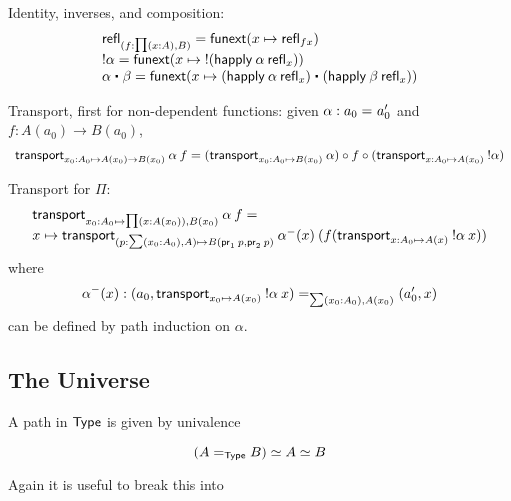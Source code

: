 
Identity, inverses, and composition:
\[
\begin{array}{l}
\refl{(f : \prd{x:A} B)} = \funext(x \mapsto \refl{f x}) \\
\opp{\alpha} = \funext (x \mapsto \opp{(\happly \: {\alpha} \: {\refl x})})  \\
{\alpha} \ct \beta = \funext (x \mapsto {(\happly \: {\alpha} \: {\refl x}) \ct (\happly \: {\beta} \: {\refl x})})  \\
\end{array}
\]

\newcommand{\fcomp}{\circ}

Transport, first for non-dependent functions: given $\alpha : \id {a_0} {a_0'}$
and $f : A(a_0) \to B(a_0)$, 
\[
\begin{array}{l}
\transport{x_0:A_0 \mapsto A(x_0) \to B(x_0)}{\alpha} \: f = 
   (\transport{x_0:A_0 \mapsto B(x_0)}{\alpha}) \fcomp f \fcomp (\transport{x:A_0 \mapsto A(x_0)}{\opp \alpha})
\end{array}
\]

Transport for $\Pi$:  
\[
\begin{array}{l}
\transport{x_0:A_0 \mapsto \prd{x : A(x_0)} B(x_0)}{\alpha} \: f =  \\
   x \mapsto 
   \transport{(p : \sm {x_0:A_0} A) \mapsto B(\proj{1} \: p, \proj{2} \: p)}{\alpha^{\mathord{-}}(x) } 
      \: (f (\transport{x:A_0 \mapsto A(x)}{\opp \alpha}\:  x))
\end{array}
\]
where 
\[
\alpha^-(x) : \id[\sm {x_0:A_0} A(x_0)] {(a_0 , \transport{x_0 \mapsto A(x_0)} {\opp \alpha} \: x)} {(a_0' , x)}
\]
can be defined by path induction on $\alpha$.  

\subsection{The Universe}

A path in $\type$ is given by univalence

\[
\eqv{(\id[\type]{A}{B})}{\eqv A B}
\]

Again it is useful to break this into 

\newcommand\isequiv{\mathsf{isEquiv}}

